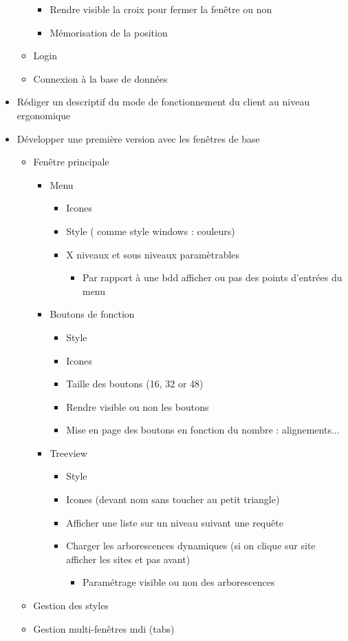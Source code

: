 \documentclass[a4paper, 12pt, french]{article}
\newcommand{\bdot}{\item[\color{ssiYellow}\ding{108}]}
\newcommand{\bdotoutlined}{\item[\color{ssiYellow}\ding{109}]}
\newcommand{\bsquare}{\item[\color{ssiYellow}\ding{110}]}
\newcommand{\bsquareoutlined}{\item[\color{ssiYellow}\ding{111}]}
\newcommand{\bdiamond}{\item[\color{ssiYellow}\ding{117}]}
\begin{document}
\begin{itemize}
\begin{itemize}
									\begin{itemize}
										\bsquare{Rendre visible la croix pour fermer la fenêtre ou non}
										\bsquare{Mémorisation de la position}
									\end{itemize}
								\bdotoutlined{Login}
								\bdotoutlined{Connexion à la base de données}
							\end{itemize}
						\bdot{Rédiger un descriptif du mode de fonctionnement du client au niveau ergonomique}
						\bdot{Développer une première version avec les fenêtres de base}
							\begin{itemize}
								\bdotoutlined{Fenêtre principale}
									\begin{itemize}
										\bsquare{Menu}
											\begin{itemize}
												\bsquareoutlined{Icones}
												\bsquareoutlined{Style ( comme style windows : couleurs)}
												\bsquareoutlined{X niveaux et sous niveaux paramètrables}
													\begin{itemize}
														\bdiamond{Par rapport à une bdd afficher ou pas des points d'entrées du menu}
													\end{itemize}
											\end{itemize}
										\bsquare{Boutons de fonction}
											\begin{itemize}
												\bsquareoutlined{Style}
												\bsquareoutlined{Icones}
												\bsquareoutlined{Taille des boutons (16, 32 or 48)}
												\bsquareoutlined{Rendre visible ou non les boutons}
												\bsquareoutlined{Mise en page des boutons en fonction du nombre : alignements...}
											\end{itemize}
										\bsquare{Treeview}
											\begin{itemize}
												\bsquareoutlined{Style}
												\bsquareoutlined{Icones (devant nom sans toucher au petit triangle)}
												\bsquareoutlined{Afficher une liste sur un niveau suivant une requête}
												\bsquareoutlined{Charger les arborescences dynamiques (si on clique sur site afficher les sites et pas avant)}
													\begin{itemize}
														\bdiamond{Paramétrage visible ou non des arborescences}
													\end{itemize}
											\end{itemize}
									\end{itemize}
								\bdotoutlined{Gestion des styles}
								\bdotoutlined{Gestion multi-fenêtres mdi (tabs)}

\end{itemize}
\end{itemize}
\end{document}
